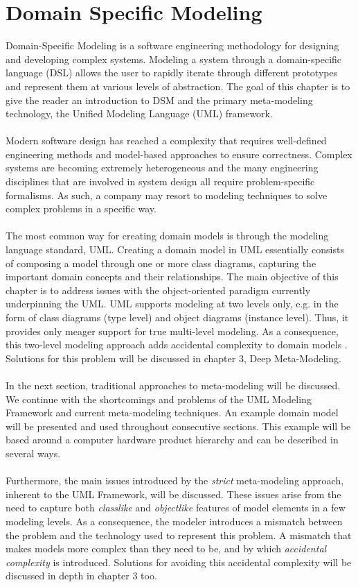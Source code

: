 \chapter{Domain Specific Modeling}

Domain-Specific Modeling is a software engineering methodology for designing and developing complex systems. Modeling a system through a domain-specific language (DSL) allows the user to rapidly iterate through different prototypes and represent them at various levels of abstraction. The goal of this chapter is to give the reader an introduction to DSM and the primary meta-modeling technology, the Unified Modeling Language (UML) framework. 
\\ \\
Modern software design has reached a complexity that requires well-defined engineering methods and model-based approaches to ensure correctness. Complex systems are becoming extremely heterogeneous and the many engineering disciplines that are involved in system design all require problem-specific formalisms. As such, a company may resort to modeling techniques to solve complex problems in a specific way.
\\ \\
The most common way for creating domain models is through the modeling language standard, UML. Creating a domain model in UML essentially consists of composing a model through one or more class diagrams, capturing the important domain concepts and their relationships. The main objective of this chapter is to address issues with the object-oriented paradigm currently underpinning the UML. UML supports modeling at two levels only, e.g. in the form of class diagrams (type level) and object diagrams (instance level). Thus, it provides only meager support for true multi-level modeling. As a consequence, this two-level modeling approach adds accidental complexity to domain models \cite{AccidentalComplexity}. Solutions for this problem will be discussed in chapter 3, Deep Meta-Modeling.
\\ \\
In the next section, traditional approaches to meta-modeling will be discussed. We continue with the shortcomings and problems of the UML Modeling Framework and current meta-modeling techniques. An example domain model will be presented and used throughout consecutive sections. This example will be based around a computer hardware product hierarchy and can be described in several ways.
\\ \\
Furthermore, the main issues introduced by the \textit{strict} meta-modeling approach, inherent to the UML Framework, will be discussed. These issues arise from the need to capture both \textit{classlike} and \textit{objectlike} features of model elements in a few modeling levels. As a consequence, the modeler introduces a mismatch between the problem and the technology used to represent this problem. A mismatch that makes models more complex than they need to be, and by which \textit{accidental complexity} is introduced. Solutions for avoiding this accidental complexity will be discussed in depth in chapter 3 too.

